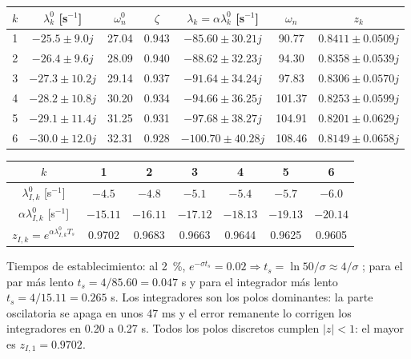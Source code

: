 \documentclass[11pt,a4paper]{article}
\makeatletter
\numberwithin{equation}{section}
\renewcommand\paragraph{\@startsection{paragraph}{4}{\z@}{1.4ex plus .4ex}{-0.6em}%
  {\normalfont\color{tinta}}}
\makeatother
\begin{document}
\begin{center}
\small\renewcommand{\arraystretch}{1.25}
\begin{tabular}{|c|c|c|c|c|c|c|}
\hline
$k$ & $\lambda_k^0$ [s$^{-1}$] & $\omega_n^0$ & $\zeta$ & $\lambda_k = \alpha\lambda_k^0$ [s$^{-1}$] & $\omega_n$ & $z_k$ \\ \hline
1 & $-25.5 \pm 9.0j$ & 27.04 & 0.943 & $-85.60 \pm 30.21j$ & 90.77 & $0.8411 \pm 0.0509j$ \\ \hline
2 & $-26.4 \pm 9.6j$ & 28.09 & 0.940 & $-88.62 \pm 32.23j$ & 94.30 & $0.8358 \pm 0.0539j$ \\ \hline
3 & $-27.3 \pm 10.2j$ & 29.14 & 0.937 & $-91.64 \pm 34.24j$ & 97.83 & $0.8306 \pm 0.0570j$ \\ \hline
4 & $-28.2 \pm 10.8j$ & 30.20 & 0.934 & $-94.66 \pm 36.25j$ & 101.37 & $0.8253 \pm 0.0599j$ \\ \hline
5 & $-29.1 \pm 11.4j$ & 31.25 & 0.931 & $-97.68 \pm 38.27j$ & 104.91 & $0.8201 \pm 0.0629j$ \\ \hline
6 & $-30.0 \pm 12.0j$ & 32.31 & 0.928 & $-100.70 \pm 40.28j$ & 108.46 & $0.8149 \pm 0.0658j$ \\ \hline
\end{tabular}

\vspace{0.6em}
\begin{tabular}{|c|c|c|c|c|c|c|}
\hline
$k$ & 1 & 2 & 3 & 4 & 5 & 6 \\ \hline
$\lambda_{I,k}^0$ [s$^{-1}$] & $-4.5$ & $-4.8$ & $-5.1$ & $-5.4$ & $-5.7$ & $-6.0$ \\ \hline
$\alpha\lambda_{I,k}^0$ [s$^{-1}$] & $-15.11$ & $-16.11$ & $-17.12$ & $-18.13$ & $-19.13$ & $-20.14$ \\ \hline
$z_{I,k} = e^{\alpha\lambda_{I,k}^0T_s}$ & 0.9702 & 0.9683 & 0.9663 & 0.9644 & 0.9625 & 0.9605 \\ \hline
\end{tabular}
\end{center}

\paragraph{Tiempos de establecimiento:} al 2~\%, $e^{-\sigma t_s} = 0.02 \Rightarrow t_s = \ln50/\sigma \approx 4/\sigma$ ; para el par más lento $t_s = 4/85.60 = 0.047$ s y para el integrador más lento $t_s = 4/15.11 = 0.265$ s. Los integradores son los polos dominantes: la parte oscilatoria se apaga en unos 47 ms y el error remanente lo corrigen los integradores en 0.20 a 0.27 s. Todos los polos discretos cumplen $|z| < 1$: el mayor es $z_{I,1} = 0.9702$.
\end{document}

